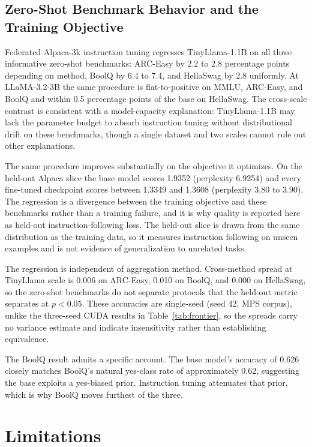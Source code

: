 \subsection{Zero-Shot Benchmark Behavior and the Training Objective}
\label{sec:baseregression}
Federated Alpaca-3k \cite{taori2023alpaca} instruction tuning regresses TinyLlama-1.1B \cite{zhang2024tinyllama} on all three informative zero-shot benchmarks: ARC-Easy by 2.2 to 2.8 percentage points depending on method, BoolQ by 6.4 to 7.4, and HellaSwag by 2.8 uniformly. At LLaMA-3.2-3B \cite{dubey2024llama3} the same procedure is flat-to-positive on MMLU, ARC-Easy, and BoolQ and within 0.5 percentage points of the base on HellaSwag. The cross-scale contrast is consistent with a model-capacity explanation: TinyLlama-1.1B may lack the parameter budget to absorb instruction tuning without distributional drift on these benchmarks, though a single dataset and two scales cannot rule out other explanations.

The same procedure improves substantially on the objective it optimizes. On the held-out Alpaca slice the base model scores 1.9352 (perplexity 6.9254) and every fine-tuned checkpoint scores between 1.3349 and 1.3608 (perplexity 3.80 to 3.90). The regression is a divergence between the training objective and these benchmarks rather than a training failure, and it is why quality is reported here as held-out instruction-following loss. The held-out slice is drawn from the same distribution as the training data, so it measures instruction following on unseen examples and is not evidence of generalization to unrelated tasks.

The regression is independent of aggregation method. Cross-method spread at TinyLlama scale is 0.006 on ARC-Easy, 0.010 on BoolQ, and 0.000 on HellaSwag, so the zero-shot benchmarks do not separate protocols that the held-out metric separates at $p < 0.05$. These accuracies are single-seed (seed 42, MPS corpus), unlike the three-seed CUDA results in Table~\ref{tab:frontier}, so the spreads carry no variance estimate and indicate insensitivity rather than establishing equivalence.

The BoolQ result admits a specific account. The base model's accuracy of 0.626 closely matches BoolQ's natural yes-class rate of approximately 0.62, suggesting the base exploits a yes-biased prior. Instruction tuning attenuates that prior, which is why BoolQ moves furthest of the three.

\section{Limitations}
\label{sec:limitations}

